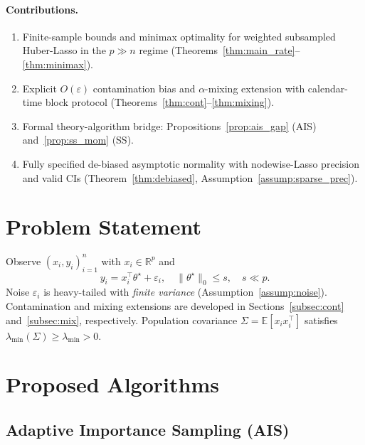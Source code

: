 \documentclass[10pt]{article}
\newcommand{\E}{\mathbb{E}}
\newcommand{\R}{\mathbb{R}}
\newcommand{\ts}{\theta^{\star}}
\begin{document}
\paragraph{Contributions.}
\begin{enumerate}\setlength\itemsep{1pt}
\item Finite-sample bounds and minimax optimality for weighted subsampled
      Huber-Lasso in the $p\gg n$ regime
      (Theorems~\ref{thm:main_rate}--\ref{thm:minimax}).
\item Explicit $O(\varepsilon)$ contamination bias and $\alpha$-mixing extension
      with calendar-time block protocol (Theorems~\ref{thm:cont}--\ref{thm:mixing}).
\item Formal theory-algorithm bridge: Propositions~\ref{prop:ais_gap}
      (AIS) and~\ref{prop:ss_mom} (SS).
\item Fully specified de-biased asymptotic normality with nodewise-Lasso
      precision and valid CIs (Theorem~\ref{thm:debiased},
      Assumption~\ref{assump:sparse_prec}).
\end{enumerate}

\section{Problem Statement}

Observe $(x_i,y_i)_{i=1}^n$ with $x_i\in\R^p$ and
\begin{equation}\label{eq:model}
  y_i = x_i^\top\ts + \varepsilon_i,\quad \|\ts\|_0\le s,\quad s\ll p.
\end{equation}
Noise $\varepsilon_i$ is heavy-tailed with \emph{finite variance}
(Assumption~\ref{assump:noise}). Contamination and mixing extensions are
developed in Sections~\ref{subsec:cont} and~\ref{subsec:mix}, respectively.
Population covariance $\Sigma=\E[x_ix_i^\top]$ satisfies
$\lambda_{\min}(\Sigma)\ge\lambda_{\min}>0$.

\section{Proposed Algorithms}

\subsection{Adaptive Importance Sampling (AIS)}
\end{document}
